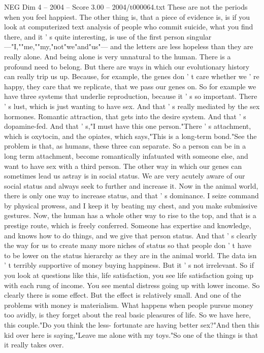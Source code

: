 \begin{textsample}{NEG Dim 4 – 2004 – Score 3.00 – 2004/t000064.txt}
These are not the periods when you feel happiest.
The other thing is, that a piece of evidence is, is if you look at computerized text analysis of people who commit suicide, what you find there, and it ' s quite interesting, is use of the first person singular —"I,""me,""my,"not"we"and"us"— and the letters are less hopeless than they are really alone.
And being alone is very unnatural to the human.
There is a profound need to belong.
But there are ways in which our evolutionary history can really trip us up.
Because, for example, the genes don ' t care whether we ' re happy, they care that we replicate, that we pass our genes on.
So for example we have three systems that underlie reproduction, because it ' s so important.
There ' s lust, which is just wanting to have sex.
And that ' s really mediated by the sex hormones.
Romantic attraction, that gets into the desire system.
And that ' s dopamine-fed.
And that ' s,"I must have this one person."There ' s attachment, which is oxytocin, and the opiates, which says,"This is a long-term bond."See the problem is that, as humans, these three can separate.
So a person can be in a long term attachment, become romantically infatuated with someone else, and want to have sex with a third person.
The other way in which our genes can sometimes lead us astray is in social status.
We are very acutely aware of our social status and always seek to further and increase it.
Now in the animal world, there is only one way to increase status, and that ' s dominance.
I seize command by physical prowess, and I keep it by beating my chest, and you make submissive gestures.
Now, the human has a whole other way to rise to the top, and that is a prestige route, which is freely conferred.
Someone has expertise and knowledge, and knows how to do things, and we give that person status.
And that ' s clearly the way for us to create many more niches of status so that people don ' t have to be lower on the status hierarchy as they are in the animal world.
The data isn ' t terribly supportive of money buying happiness.
But it ' s not irrelevant.
So if you look at questions like this, life satisfaction, you see life satisfaction going up with each rung of income.
You see mental distress going up with lower income.
So clearly there is some effect.
But the effect is relatively small.
And one of the problems with money is materialism.
What happens when people pursue money too avidly, is they forget about the real basic pleasures of life.
So we have here, this couple."Do you think the less- fortunate are having better sex?"And then this kid over here is saying,"Leave me alone with my toys."So one of the things is that it really takes over.

\end{textsample}
